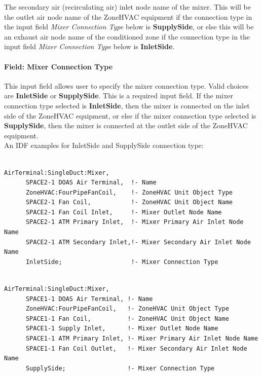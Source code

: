 The secondary air (recirculating air) inlet node name of the mixer. This will be the outlet air node name of the ZoneHVAC equipment if the connection type in the input field \textit{Mixer Connection Type} below is \textbf{SupplySide}, or else this will be an exhaust air node name of the conditioned zone if the connection type in the input field \textit{Mixer Connection Type} below is \textbf{InletSide}.

\paragraph{Field: Mixer Connection Type}\label{field-mixer-connection-type}

This input field allows user to specify the mixer connection type. Valid choices are \textbf{InletSide} or \textbf{SupplySide}. This is a required input field. If the mixer connection type selected is \textbf{InletSide}, then the mixer is connected on the inlet side of the ZoneHVAC equipment, or else if the mixer connection type selected is \textbf{SupplySide}, then the mixer is connected at the outlet side of the ZoneHVAC equipment.\\ 

An IDF examples for InletSide and SupplySide connection type:

\begin{lstlisting}

AirTerminal:SingleDuct:Mixer,
      SPACE2-1 DOAS Air Terminal,  !- Name
      ZoneHVAC:FourPipeFanCoil,    !- ZoneHVAC Unit Object Type
      SPACE2-1 Fan Coil,           !- ZoneHVAC Unit Object Name
      SPACE2-1 Fan Coil Inlet,     !- Mixer Outlet Node Name
      SPACE2-1 ATM Primary Inlet,  !- Mixer Primary Air Inlet Node Name
      SPACE2-1 ATM Secondary Inlet,!- Mixer Secondary Air Inlet Node Name
      InletSide;                   !- Mixer Connection Type   
\end{lstlisting}

\begin{lstlisting}

AirTerminal:SingleDuct:Mixer,
      SPACE1-1 DOAS Air Terminal, !- Name
      ZoneHVAC:FourPipeFanCoil,   !- ZoneHVAC Unit Object Type
      SPACE1-1 Fan Coil,          !- ZoneHVAC Unit Object Name
      SPACE1-1 Supply Inlet,      !- Mixer Outlet Node Name
      SPACE1-1 ATM Primary Inlet, !- Mixer Primary Air Inlet Node Name
      SPACE1-1 Fan Coil Outlet,   !- Mixer Secondary Air Inlet Node Name
      SupplySide;                 !- Mixer Connection Type
\end{lstlisting}

